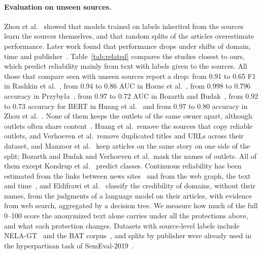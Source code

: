 \documentclass[11pt,a4paper]{article}
\begin{document}
\paragraph{Evaluation on unseen sources.} Zhou et al.~\cite{zhou2021hidden} showed that models trained on labels
inherited from the sources learn the sources themselves, and that random splits of the articles overestimate
performance. Later work found that performance drops under shifts of domain, time and
publisher~\cite{azizov-etal-2024-safari,burdisso-etal-2024-reliability,verhoeven2025yesterday}. Table~\ref{tab:related}
compares the studies closest to ours, which predict reliability mainly from text with labels given to the sources. All
those that compare seen with unseen sources report a drop: from 0.91 to 0.65 F1 in Rashkin et
al.~\cite{rashkin2017truth}, from 0.94 to 0.86 AUC in Horne et al.~\cite{horne2019robust}, from 0.998 to 0.796 accuracy
in Przyby{\l}a~\cite{przybyla2020capturing}, from 0.97 to 0.72 AUC in Bozarth and Budak~\cite{bozarth2020toward}, from 0.92 to 0.73
accuracy for BERT in Huang et al.~\cite{huang2020conquering} and from 0.97 to 0.80 accuracy in Zhou et
al.~\cite{zhou2021hidden}.
None of them keeps the outlets of the same owner apart, although outlets often share
content~\cite{horne2019spirals,gruppi2021tell}. Huang et al.\ remove the sources that copy reliable outlets, and
Verhoeven et al.\ remove duplicated titles and URLs across their dataset, and Manzoor et al.~\cite{manzoor2026multiview}
keep articles on the same story on one side of the split; Bozarth and Budak and Verhoeven et al.\ mask the names of
outlets. All of them except Kondrup et al.~\cite{kondrup2026credibench} predict classes. Continuous reliability has been estimated from the links between news
sites~\cite{burdisso-etal-2024-reliability} and from the web graph, the text and time~\cite{kondrup2026credibench}, and
Eldifrawi et al.~\cite{eldifrawi2026temporal} classify the credibility of domains, without their names, from the
judgments of a language model on their articles, with evidence from web search, aggregated by a decision tree. We measure how much of the full 0--100 score the anonymized text alone carries under all the protections above,
and what each protection changes. Datasets with source-level labels include NELA-GT~\cite{gruppi2021nela} and the BAT corpus~\cite{DBLP:journals/dbsk/AdjiLS26,batDataset}, and splits by publisher were already used in the hyperpartisan
task of SemEval-2019~\cite{kiesel2019semeval}.
\end{document}
